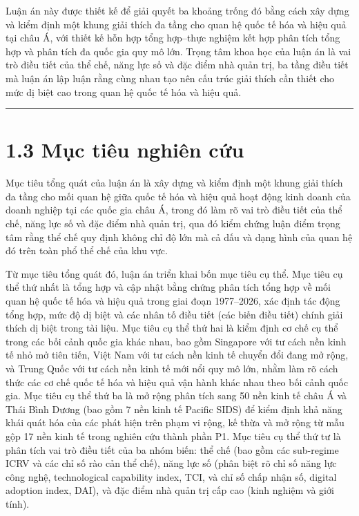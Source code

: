 \documentclass[
  a4paper,
  13pt]{extreport}
\begin{document}
Luận án này được thiết kế để giải quyết ba khoảng trống đó bằng cách xây
dựng và kiểm định một khung giải thích đa tầng cho quan hệ quốc tế hóa
và hiệu quả tại châu Á, với thiết kế hỗn hợp tổng hợp--thực nghiệm kết
hợp phân tích tổng hợp và phân tích đa quốc gia quy mô lớn. Trọng tâm
khoa học của luận án là vai trò điều tiết của thể chế, năng lực số và
đặc điểm nhà quản trị, ba tầng điều tiết mà luận án lập luận rằng cùng
nhau tạo nên cấu trúc giải thích cần thiết cho mức dị biệt cao trong
quan hệ quốc tế hóa và hiệu quả.

\begin{center}\rule{0.5\linewidth}{0.5pt}\end{center}

\hypertarget{mux1ee5c-tiuxeau-nghiuxean-cux1ee9u}{%
\section{1.3 Mục tiêu nghiên
cứu}\label{mux1ee5c-tiuxeau-nghiuxean-cux1ee9u}}

Mục tiêu tổng quát của luận án là xây dựng và kiểm định một khung giải
thích đa tầng cho mối quan hệ giữa quốc tế hóa và hiệu quả hoạt động
kinh doanh của doanh nghiệp tại các quốc gia châu Á, trong đó làm rõ vai
trò điều tiết của thể chế, năng lực số và đặc điểm nhà quản trị, qua đó
kiểm chứng luận điểm trọng tâm rằng thể chế quy định không chỉ độ lớn mà
cả dấu và dạng hình của quan hệ đó trên toàn phổ thể chế của khu vực.

Từ mục tiêu tổng quát đó, luận án triển khai bốn mục tiêu cụ thể. Mục
tiêu cụ thể thứ nhất là tổng hợp và cập nhật bằng chứng phân tích tổng
hợp về mối quan hệ quốc tế hóa và hiệu quả trong giai đoạn 1977--2026,
xác định tác động tổng hợp, mức độ dị biệt và các nhân tố điều tiết (các
biến điều tiết) chính giải thích dị biệt trong tài liệu. Mục tiêu cụ thể
thứ hai là kiểm định cơ chế cụ thể trong các bối cảnh quốc gia khác
nhau, bao gồm Singapore với tư cách nền kinh tế nhỏ mở tiên tiến, Việt
Nam với tư cách nền kinh tế chuyển đổi đang mở rộng, và Trung Quốc với
tư cách nền kinh tế mới nổi quy mô lớn, nhằm làm rõ cách thức các cơ chế
quốc tế hóa và hiệu quả vận hành khác nhau theo bối cảnh quốc gia. Mục
tiêu cụ thể thứ ba là mở rộng phân tích sang 50 nền kinh tế châu Á và
Thái Bình Dương (bao gồm 7 nền kinh tế Pacific SIDS) để kiểm định khả
năng khái quát hóa của các phát hiện trên phạm vi rộng, kế thừa và mở
rộng từ mẫu gộp 17 nền kinh tế trong nghiên cứu thành phần P1. Mục tiêu
cụ thể thứ tư là phân tích vai trò điều tiết của ba nhóm biến: thể chế
(bao gồm các sub-regime ICRV và các chỉ số rào cản thể chế), năng lực số
(phân biệt rõ chỉ số năng lực công nghệ, technological capability index,
TCI, và chỉ số chấp nhận số, digital adoption index, DAI), và đặc điểm
nhà quản trị cấp cao (kinh nghiệm và giới tính).
\end{document}
